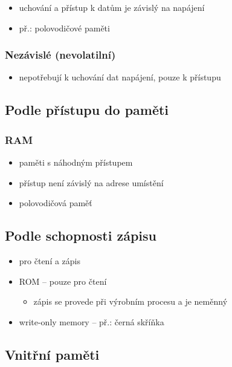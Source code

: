 \documentclass[a4paper,12pt]{article}
\providecommand{\tightlist}{%
\setlength{\itemsep}{0pt}\setlength{\parskip}{0pt}}
\begin{document}
\begin{itemize}
\tightlist
\item uchování a přístup k datům je závislý na napájení
\item př.: polovodičové paměti
\end{itemize}

\subsubsection{Nezávislé (nevolatilní)}

\begin{itemize}
\tightlist
\item nepotřebují k uchování dat napájení, pouze k přístupu
\end{itemize}

\subsection{Podle přístupu do paměti}

\subsubsection{RAM}

\begin{itemize}
\tightlist
\item paměti s náhodným přístupem
\item přístup není závislý na adrese umístění
\item polovodičová paměť
\end{itemize}

\subsection{Podle schopnosti zápisu}

\begin{itemize}
\tightlist
\item pro čtení a zápis
\item ROM -- pouze pro čtení

  \begin{itemize}
  \tightlist
  \item zápis se provede při výrobním procesu a je neměnný
  \end{itemize}
\item write-only memory -- př.: černá skříňka
\end{itemize}

\subsection{Vnitřní paměti}
\end{document}
